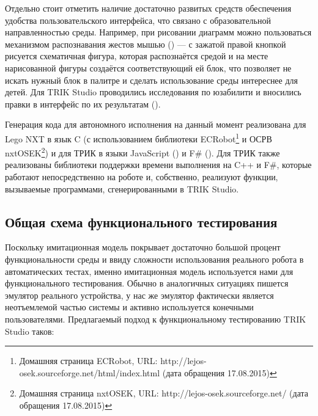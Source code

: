 \documentclass[conference]{IEEEtran}
\begin{document}
Отдельно стоит отметить наличие достаточно развитых средств обеспечения удобства пользовательского интерфейса, 
что связано с образовательной направленностью среды. Например, при рисовании диаграмм можно пользоваться механизмом 
распознавания жестов мышью (\cite{osechkina2012multistroke}) --- с зажатой правой кнопкой рисуется схематичная фигура, которая распознаётся средой 
и на месте нарисованной фигуры создаётся соответствующий ей блок, что позволяет не искать нужный блок в палитре 
и сделать использование среды интереснее для детей. Для TRIK Studio проводились исследования по юзабилити 
и вносились правки в интерфейс по их результатам (\cite{sokovikova2012usability, kuzenkova2013course}).

Генерация кода для автономного исполнения на данный момент реализована для Lego NXT в язык C (с использованием 
библиотеки ECRobot\footnote{Домашняя страница ECRobot, URL: http://lejos-osek.sourceforge.net/html/index.html (дата обращения 17.08.2015)} 
и ОСРВ nxtOSEK\footnote{Домашняя страница nxtOSEK, URL: http://lejos-osek.sourceforge.net/ (дата обращения 17.08.2015)}) 
и для ТРИК в языки JavaScript (\cite{terekhov2013qreal}) и F\# (\cite{kirsanov2014robotics}). Для ТРИК 
также реализованы библиотеки поддержки времени выполнения на C++ и F\#, которые работают непосредственно 
на роботе и, собственно, реализуют функции, вызываемые программами, сгенерированными в TRIK Studio.

\subsection{Общая схема функционального тестирования}

Поскольку имитационная модель покрывает достаточно большой процент функциональности среды и ввиду сложности 
использования реального робота в автоматических тестах, именно имитационная модель используется нами для 
функционального тестирования. Обычно в аналогичных ситуациях пишется эмулятор реального устройства, у нас же 
эмулятор фактически является неотъемлемой частью системы и активно используется конечными пользователями. 
Предлагаемый подход к функциональному тестированию TRIK Studio таков:
\end{document}
